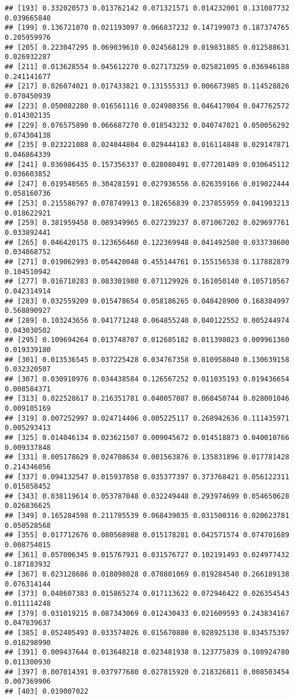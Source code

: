 \documentclass[
]{article}
\begin{document}
\begin{verbatim}
## [193] 0.332020573 0.013762142 0.071321571 0.014232001 0.131087732 0.039665840
## [199] 0.136721070 0.021193097 0.066837232 0.147199073 0.187374765 0.205959976
## [205] 0.223047295 0.069039610 0.024568129 0.019831885 0.012588631 0.026932287
## [211] 0.013628554 0.045612270 0.027173259 0.025821095 0.036946188 0.241141677
## [217] 0.026074021 0.017433821 0.131555313 0.006673985 0.114528826 0.070450939
## [223] 0.050082280 0.016561116 0.024980356 0.046417004 0.047762572 0.014302135
## [229] 0.076575890 0.066687270 0.018543232 0.040747021 0.050056292 0.074304138
## [235] 0.023221088 0.024044804 0.029444183 0.016114848 0.029147871 0.046864339
## [241] 0.036986435 0.157356337 0.028080491 0.077201489 0.030645112 0.036603852
## [247] 0.019540565 0.304281591 0.027936556 0.026359166 0.019022444 0.058160736
## [253] 0.215586797 0.078749913 0.182656839 0.237855959 0.041903213 0.018622921
## [259] 0.381959458 0.089349965 0.027239237 0.071067202 0.029697761 0.033892441
## [265] 0.046420175 0.123656460 0.122369948 0.041492580 0.033738600 0.034868752
## [271] 0.019062993 0.054420048 0.455144761 0.155156538 0.117882879 0.104510942
## [277] 0.016710283 0.083301980 0.071129926 0.161050140 0.105710567 0.042314914
## [283] 0.032559209 0.015478654 0.058186265 0.048428900 0.168384997 0.568890927
## [289] 0.103243656 0.041771248 0.064855240 0.040122552 0.005244974 0.043030502
## [295] 0.109694264 0.013748707 0.012685182 0.011398023 0.009961360 0.019339180
## [301] 0.013536545 0.037225428 0.034767358 0.010958040 0.130639158 0.032320507
## [307] 0.030910976 0.034438584 0.126567252 0.011035193 0.019436654 0.008584371
## [313] 0.022528617 0.216351781 0.040057087 0.068450744 0.028001046 0.009105169
## [319] 0.007252997 0.024714406 0.005225117 0.268942636 0.111435971 0.005293413
## [325] 0.014046134 0.023621507 0.009045672 0.014518873 0.040010766 0.009337848
## [331] 0.005178629 0.024708634 0.001563876 0.135831896 0.017781428 0.214346056
## [337] 0.094132547 0.015937858 0.035377397 0.373768421 0.056122311 0.015858452
## [343] 0.038119614 0.053787048 0.032249448 0.293974699 0.054650628 0.026836625
## [349] 0.165284598 0.211785539 0.068439035 0.031500316 0.020623781 0.050528568
## [355] 0.017712676 0.080568988 0.015178281 0.042571574 0.074701689 0.008754015
## [361] 0.057006345 0.015767931 0.031576727 0.102191493 0.024977432 0.187183932
## [367] 0.023128686 0.018098028 0.070801069 0.019284540 0.266189138 0.076314144
## [373] 0.048607383 0.015865274 0.017113622 0.072946422 0.026354543 0.011114248
## [379] 0.031019215 0.087343069 0.012430433 0.021609593 0.243834167 0.047839637
## [385] 0.052405493 0.033574026 0.015670880 0.028925130 0.034575397 0.018298990
## [391] 0.009437644 0.013648218 0.023481938 0.123775839 0.108924780 0.011300930
## [397] 0.007014391 0.037977680 0.027815920 0.218326811 0.008503454 0.007369906
## [403] 0.019007022
\end{verbatim}
\end{document}
